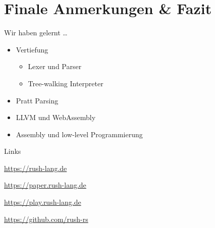 \section{Finale Anmerkungen \& Fazit}
\begin{frame}{Wir haben gelernt \dots}
	\begin{itemize}
		\item<1-> Vertiefung
			\begin{itemize}
				\item <1-> Lexer und Parser
				\item <1-> Tree-walking Interpreter
			\end{itemize}
		\item<2-> Pratt Parsing
		\item<3-> LLVM und WebAssembly
		\item<4-> Assembly und low-level Programmierung
	\end{itemize}
\end{frame}

\begin{frame}{Links}
	\centering
	\begin{minipage}{.5\textwidth}
		\begin{description}
			\item<1->[rush Website] \url{https://rush-lang.de}
			\item<2->[Paper] \url{https://paper.rush-lang.de}
			\item<3->[Playground] \url{https://play.rush-lang.de}
			\item<4->[GitHub] \url{https://github.com/rush-rs}
		\end{description}
	\end{minipage}
\end{frame}
